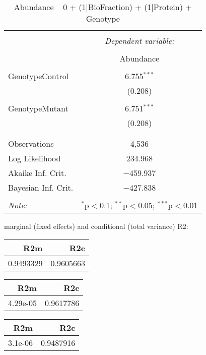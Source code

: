 \documentclass[11pt]{report}
\begin{document}
\begin{table}[!htbp] \centering 
  \caption{Abundance ~ 0 + (1|BioFraction) + (1|Protein) + Genotype} 
  \label{} 
\begin{tabular}{@{\extracolsep{5pt}}lc} 
\\[-1.8ex]\hline 
\hline \\[-1.8ex] 
 & \multicolumn{1}{c}{\textit{Dependent variable:}} \\ 
\cline{2-2} 
\\[-1.8ex] & Abundance \\ 
\hline \\[-1.8ex] 
 GenotypeControl & 6.755$^{***}$ \\ 
  & (0.208) \\ 
  & \\ 
 GenotypeMutant & 6.751$^{***}$ \\ 
  & (0.208) \\ 
  & \\ 
\hline \\[-1.8ex] 
Observations & 4,536 \\ 
Log Likelihood & 234.968 \\ 
Akaike Inf. Crit. & $-$459.937 \\ 
Bayesian Inf. Crit. & $-$427.838 \\ 
\hline 
\hline \\[-1.8ex] 
\textit{Note:}  & \multicolumn{1}{r}{$^{*}$p$<$0.1; $^{**}$p$<$0.05; $^{***}$p$<$0.01} \\ 
\end{tabular} 
\end{table} 
marginal (fixed effects) and conditional (total variance) R2:

\begin{tabular}{r|r}
\hline
R2m & R2c\\
\hline
0.9493329 & 0.9605663\\
\hline
\end{tabular}

\begin{tabular}{r|r}
\hline
R2m & R2c\\
\hline
4.29e-05 & 0.9617786\\
\hline
\end{tabular}

\begin{tabular}{r|r}
\hline
R2m & R2c\\
\hline
3.1e-06 & 0.9487916\\
\hline
\end{tabular}
\end{document}
